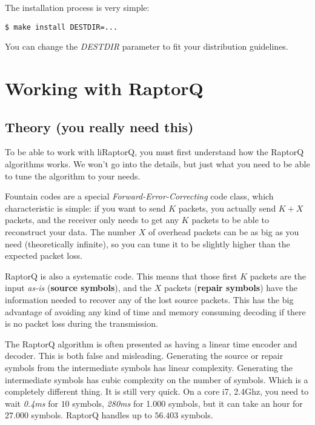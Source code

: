\documentclass[11pt,a4paper]{refart}
\begin{document}
The installation process is very simple:

\begin{verbatim}
$ make install DESTDIR=...
\end{verbatim}

You can change the \textit{DESTDIR} parameter to fit your distribution guidelines.

\newpage


\section{Working with RaptorQ}
\subsection{Theory (you really need this)}

To be able to work with liRaptorQ, you must first understand how the RaptorQ algorithms works. We won't go into the details, but just what you need
to be able to tune the algorithm to your needs.


Fountain codes are a special \textit{Forward-Error-Correcting} code class, which characteristic is simple: if you want to send $K$ packets, you actually
send $K+X$ packets, and the receiver only needs to get any $K$ packets to be able to reconstruct your data. The number $X$ of overhead packets can be as big
as you need (theoretically infinite), so you can tune it to be slightly higher than the expected packet loss.

 RaptorQ is also a systematic code. This means that those first $K$ packets are the input \textit{as-is} (\textbf{source symbols}),
and the $X$ packets (\textbf{repair symbols}) have the information needed to recover any of the lost source packets. This has the big advantage of
avoiding any kind of time and memory consuming decoding if there is no packet loss during the transmission.

 The RaptorQ algorithm is often presented as having a linear time encoder and decoder. This is both false and misleading.
Generating the source or repair symbols from the intermediate symbols has linear complexity. Generating the intermediate symbols has cubic complexity on the
number of symbols. Which is a completely different thing.
It is still very quick. On a core i7, 2.4Ghz, you need to wait \textit{0.4ms} for $10$ symbols, \textit{280ms} for 1.000 symbols, but it can take an hour for $27.000$ symbols.
RaptorQ handles up to $56.403$ symbols.
\end{document}
